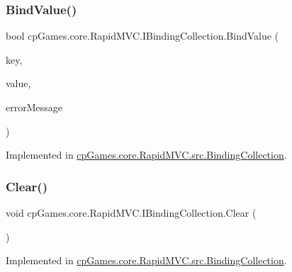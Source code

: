 \subsubsection{\texorpdfstring{BindValue()}{BindValue()}}
{\footnotesize\ttfamily bool cp\+Games.\+core.\+Rapid\+M\+V\+C.\+I\+Binding\+Collection.\+Bind\+Value (\begin{DoxyParamCaption}\item[{\mbox{\hyperlink{interfacecp_games_1_1core_1_1_rapid_m_v_c_1_1_i_binding_key}{I\+Binding\+Key}}}]{key,  }\item[{object}]{value,  }\item[{out string}]{error\+Message }\end{DoxyParamCaption})}



Implemented in \mbox{\hyperlink{classcp_games_1_1core_1_1_rapid_m_v_c_1_1src_1_1_binding_collection_afb78998cb899e8a918b654505d521f7b}{cp\+Games.\+core.\+Rapid\+M\+V\+C.\+src.\+Binding\+Collection}}.

\mbox{\label{interfacecp_games_1_1core_1_1_rapid_m_v_c_1_1_i_binding_collection_ac77dd990cf638c604bb90646e2fed55d}} 
\subsubsection{\texorpdfstring{Clear()}{Clear()}}
{\footnotesize\ttfamily void cp\+Games.\+core.\+Rapid\+M\+V\+C.\+I\+Binding\+Collection.\+Clear (\begin{DoxyParamCaption}{ }\end{DoxyParamCaption})}



Implemented in \mbox{\hyperlink{classcp_games_1_1core_1_1_rapid_m_v_c_1_1src_1_1_binding_collection_a7c3b2155a17bdb3f1d94a1e003fbb3c7}{cp\+Games.\+core.\+Rapid\+M\+V\+C.\+src.\+Binding\+Collection}}.

\mbox{\label{interfacecp_games_1_1core_1_1_rapid_m_v_c_1_1_i_binding_collection_affd71123e4a9ce2af8013c57b216332c}} 
